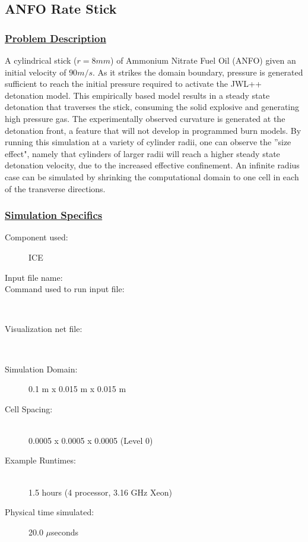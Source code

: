 \subsection*{\center ANFO Rate Stick}
\subsubsection*{\underline{Problem Description}}
A cylindrical stick ($r = 8 mm$) of Ammonium Nitrate Fuel Oil (ANFO) given an initial
velocity of $90 m/s$.  As it strikes the domain boundary, pressure is generated
sufficient to reach the initial pressure required to activate the 
JWL++~\cite{ref:JWL} detonation model.  This empirically based model results
in a steady state detonation that traverses the stick, consuming the solid 
explosive and generating high pressure gas.  The experimentally observed
curvature is generated at the detonation front, a feature that will not develop
in programmed burn models.  By running this simulation at
a variety of cylinder radii, one can observe the ''size effect", namely that
cylinders of larger radii will reach a higher steady state detonation velocity,
due to the increased effective confinement.  An infinite radius case can be
simulated by shrinking the computational domain to one cell in each of the
transverse directions.

%
\subsubsection*{\underline{Simulation Specifics}}
\begin{description}
\item [Component used:] \hfill ICE
\item [Input file name:] \hfill {}
\item [Command used to run input file:]\hfill \\
\item [Visualization net file:]\hfill {}\\

\item [Simulation Domain:]\hfill    0.1 m x 0.015 m x 0.015 m
\item [Cell Spacing:]\hfill \\
0.0005  x 0.0005  x 0.0005 (Level 0)\\

\item [Example Runtimes:] \hfill \\
 1.5 hours   (4 processor, 3.16 GHz Xeon)

\item [Physical time simulated:] \hfill 20.0 $\mu$seconds

\end{description}

